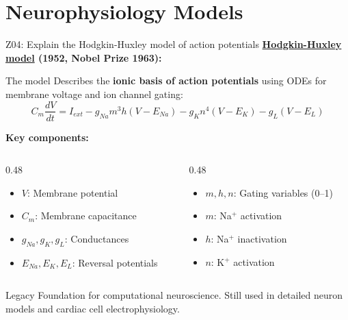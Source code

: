 \documentclass[aspectratio=169, 10pt]{beamer}
\begin{document}
\section{Neurophysiology Models}

\begin{frame}{Z04: Explain the Hodgkin-Huxley model of action potentials}
    \textbf{\href{https://en.wikipedia.org/wiki/Hodgkin\%E2\%80\%93Huxley_model}{Hodgkin-Huxley model} (1952, Nobel Prize 1963):}
    
    \begin{block}{The model}
        Describes the \textbf{ionic basis of action potentials} using ODEs for membrane voltage and ion channel gating:
        \[
        C_m \frac{dV}{dt} = I_{ext} - g_{Na}m^3h(V - E_{Na}) - g_K n^4(V - E_K) - g_L(V - E_L)
        \]
    \end{block}
    
    \vspace{0.1cm}
    \textbf{Key components:}
    \begin{columns}[T]
        \begin{column}{0.48\textwidth}
            \begin{itemize}
                \item $V$: Membrane potential
                \item $C_m$: Membrane capacitance
                \item $g_{Na}, g_K, g_L$: Conductances
                \item $E_{Na}, E_K, E_L$: Reversal potentials
            \end{itemize}
        \end{column}
        \begin{column}{0.48\textwidth}
            \begin{itemize}
                \item $m, h, n$: Gating variables (0--1)
                \item $m$: Na$^+$ activation
                \item $h$: Na$^+$ inactivation
                \item $n$: K$^+$ activation
            \end{itemize}
        \end{column}
    \end{columns}
    
    \vspace{0.15cm}
    {\small
    \begin{alertblock}{Legacy}
        Foundation for computational neuroscience. Still used in detailed neuron models and cardiac cell electrophysiology.
    \end{alertblock}
    }
\end{frame}
\end{document}
